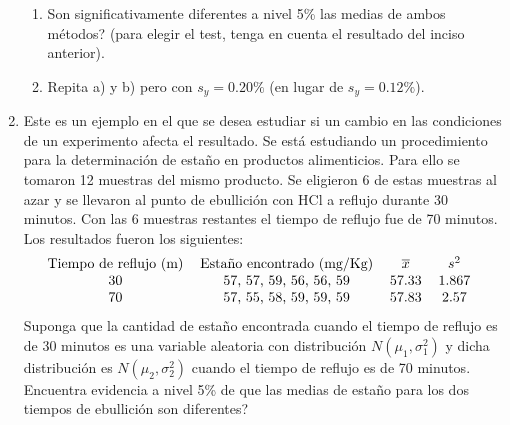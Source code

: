 \documentclass[11pt,a4paper,twoside]{article}%
\begin{document}
\begin{enumerate}
\begin{enumerate}
\item \textquestiondown Son significativamente diferentes a nivel 5\% las
medias de ambos m\'{e}todos? (para elegir el test, tenga en cuenta el
resultado del inciso anterior).

\item Repita a) y b) pero con $s_{y}=0.20\%$ (en lugar de $s_{y}=0.12\%$).
\end{enumerate}

\item Este es un ejemplo en el que se desea estudiar si un cambio en las
condiciones de un experimento afecta el resultado. Se est\'{a} estudiando un
procedimiento para la determinaci\'{o}n de esta\~{n}o en productos
alimenticios. Para ello se tomaron 12 muestras del mismo producto. Se
eligieron 6 de estas muestras al azar y se llevaron al punto de ebullici\'{o}n
con HCl a reflujo durante 30 minutos. Con las 6 muestras restantes el tiempo
de reflujo fue de 70 minutos. Los resultados fueron los siguientes:%
\[%
\begin{tabular}
[c]{cccc}%
Tiempo de reflujo (m)\qquad & Esta\~{n}o encontrado (mg/Kg) & $\overline{x}$ &
$s^{2}$\\
30 & 57, 57, 59, 56, 56, 59 & 57.33 & 1.867\\
70 & 57, 55, 58, 59, 59, 59 & 57.83 & 2.57
\end{tabular}
\ \
\]
Suponga que la cantidad de esta\~{n}o encontrada cuando el tiempo de reflujo
es de 30 minutos es una variable aleatoria con distribuci\'{o}n $N(\mu
_{1},\sigma_{1}^{2})$ y dicha distribuci\'{o}n es $N(\mu_{2},\sigma_{2}^{2})$
cuando el tiempo de reflujo es de 70 minutos. \textquestiondown Encuentra
evidencia a nivel 5\% de que las medias de esta\~{n}o para los dos tiempos de
ebullici\'{o}n son diferentes?


\end{enumerate}
\end{document}
